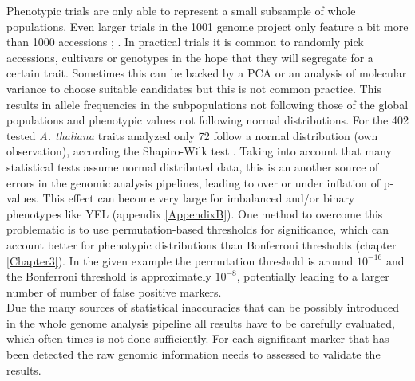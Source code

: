 Phenotypic trials are only able to represent a small subsample of whole populations. Even
larger trials in the 1001 genome project only feature a bit more than 1000 accessions
\cite{atwell2010}; \cite{1001genome}. In practical trials it is common to randomly pick
accessions, cultivars or genotypes in the hope that they will segregate for a certain
trait. Sometimes this can be backed by a PCA or an analysis of molecular variance to
choose suitable candidates \cite{holker2019european} but this is not common practice. This
results in allele frequencies in the subpopulations not following those of the global
populations and phenotypic values not following normal distributions. For the 402 tested
\textit{A. thaliana} traits analyzed only 72 follow a normal distribution (own
observation), according the Shapiro-Wilk test \cite{shapiro1965analysis}. Taking into
account that many statistical tests assume normal distributed data, this is an another
source of errors in the genomic analysis pipelines, leading to over or under inflation of
p-values. This effect can become very large for imbalanced and/or binary phenotypes like
YEL (appendix \ref{AppendixB}). One method to overcome this problematic is to use
permutation-based thresholds for significance, which can account better for phenotypic
distributions than Bonferroni thresholds (chapter \ref{Chapter3}). In the given example
the permutation threshold is around $10^{-16}$ and the Bonferroni threshold is
approximately $10^{-8 }$, potentially leading to a larger number of number of false
positive markers.\\
Due the many sources of statistical inaccuracies that can be possibly introduced in the
whole genome analysis pipeline all results have to be carefully evaluated, which often
times is not done sufficiently. For each significant marker that has been detected the raw
genomic information needs to assessed to validate the results.



